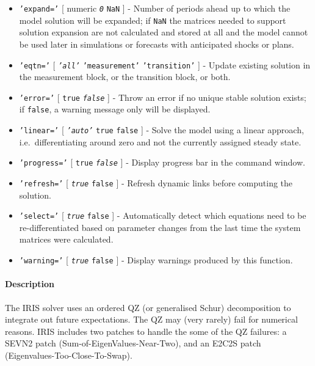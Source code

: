 \begin{itemize}
\item
  \texttt{'expand='} {[} numeric \textbar{} \emph{\texttt{0}} \textbar{}
  \texttt{NaN} {]} - Number of periods ahead up to which the model
  solution will be expanded; if \texttt{NaN} the matrices needed to
  support solution expansion are not calculated and stored at all and
  the model cannot be used later in simulations or forecasts with
  anticipated shocks or plans.
\item
  \texttt{'eqtn='} {[} \emph{\texttt{'all'}} \textbar{}
  \texttt{'measurement'} \textbar{} \texttt{'transition'} {]} - Update
  existing solution in the measurement block, or the transition block,
  or both.
\item
  \texttt{'error='} {[} \texttt{true} \textbar{} \emph{\texttt{false}}
  {]} - Throw an error if no unique stable solution exists; if
  \texttt{false}, a warning message only will be displayed.
\item
  \texttt{'linear='} {[} \emph{\texttt{'auto'}} \textbar{} \texttt{true}
  \textbar{} \texttt{false} {]} - Solve the model using a linear
  approach, i.e.~differentiating around zero and not the currently
  assigned steady state.
\item
  \texttt{'progress='} {[} \texttt{true} \textbar{}
  \emph{\texttt{false}} {]} - Display progress bar in the command
  window.
\item
  \texttt{'refresh='} {[} \emph{\texttt{true}} \textbar{} \texttt{false}
  {]} - Refresh dynamic links before computing the solution.
\item
  \texttt{'select='} {[} \emph{\texttt{true}} \textbar{} \texttt{false}
  {]} - Automatically detect which equations need to be
  re-differentiated based on parameter changes from the last time the
  system matrices were calculated.
\item
  \texttt{'warning='} {[} \emph{\texttt{true}} \textbar{} \texttt{false}
  {]} - Display warnings produced by this function.
\end{itemize}

\paragraph{Description}

The IRIS solver uses an ordered QZ (or generalised Schur) decomposition
to integrate out future expectations. The QZ may (very rarely) fail for
numerical reasons. IRIS includes two patches to handle the some of the
QZ failures: a SEVN2 patch (Sum-of-EigenValues-Near-Two), and an E2C2S
patch (Eigenvalues-Too-Close-To-Swap).

